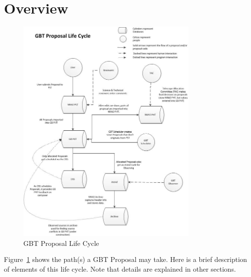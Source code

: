 \documentclass{article}
\begin{document}
\section{Overview}

\begin{figure}[htb]
\centering
\includegraphics[width=0.8\textwidth]{ProposalLifeCycle.jpg}
\caption{GBT Proposal Life Cycle}
\label{proposal_life_cycle_image}
\end{figure}

Figure~\ref{proposal_life_cycle_image} shows the path(s) a GBT Proposal may take.
Here is a brief description of elements of this life cycle.  Note that details
are explained in other sections.
\end{document}
